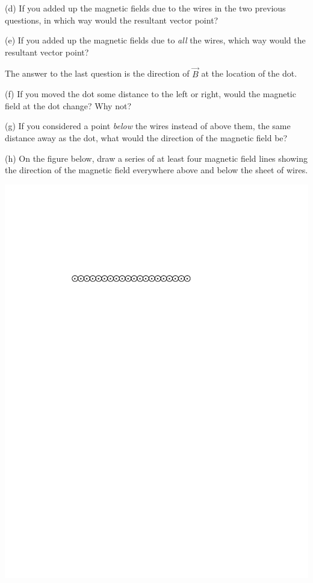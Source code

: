 (d) If you added up the magnetic fields due to the wires in the two
previous questions, in which way would the resultant vector point?
\answerspace{0.5in}

(e) If you added up the magnetic fields due to \textit{all} the wires,
which way would the resultant vector point?
\answerspace{0.5in}

The answer to the last question is the direction of $\vec B$ at 
the location of the dot.

(f) If you moved the dot some distance to the left or right,
would the magnetic field at the dot change? Why not?
\answerspace{0.5in}

(g) If you considered a point \textit{below} the wires instead of
above them, the same distance away as the dot, what would the
direction of the magnetic field be?
\answerspace{0.5in}

(h) On the figure below, draw a series of at least four magnetic field lines showing the direction of the magnetic field everywhere above and below the sheet of wires.
\begin{center}
\centerline{\includegraphics{amperes_law_infinite_sheet/wires_without_dot.pdf}}
\end{center}

